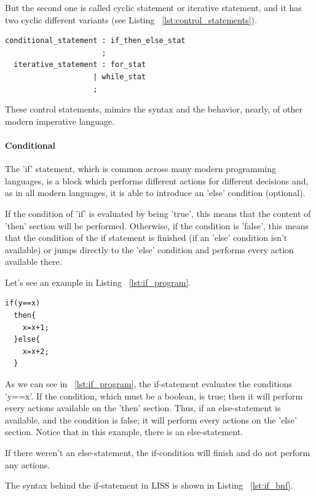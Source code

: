 \documentclass[
  oneside,
  11pt, a4paper,
  footinclude=true,
  headinclude=true,
  cleardoublepage=empty
]{scrbook}
\begin{document}
But the second one is called cyclic statement or iterative statement, and it has two cyclic different variants (see Listing ~\ref{lst:control_statements}).

\begin{lstlisting}[caption={BNF of control statements in LISS},label={lst:control_statements}]
  conditional_statement : if_then_else_stat
                      ;
  iterative_statement : for_stat
                    | while_stat
                    ;
\end{lstlisting}

These control statements, mimics the syntax and the behavior, nearly,  of other modern imperative language.

\paragraph{Conditional}

The 'if' statement, which is common across many modern programming languages, is a block which performs different actions for different decisions and, as in all modern languages, it is able to introduce an 'else' condition (optional).

If the condition of 'if' is evaluated by being 'true', this means that the content of 'then' section will be performed. Otherwise, if the condition is 'false', this means that the condition of the if statement is finished (if an 'else' condition isn't available) or jumps directly to the 'else' condition and performs every action available there.

Let's see an example in Listing ~\ref{lst:if_program}.

\begin{lstlisting}[caption={LISS syntax of a if statement},label={lst:if_program}]
  if(y==x)
  then{
    x=x+1;
  }else{
    x=x+2;
  }
\end{lstlisting}

As we can see in ~\ref{lst:if_program}, the if-statement evaluates the conditions 'y==x'.
If the condition, which must be a boolean, is true; then it will perform every actions available on the 'then' section.
Thus, if an else-statement is available, and the condition is false; it will perform every actions on the 'else' section. Notice that in this example, there is an else-statement.

If there weren't an else-statement, the if-condition will finish and do not perform any actions.


The syntax behind the if-statement in LISS is shown in Listing ~\ref{lst:if_bnf}.
\end{document}
